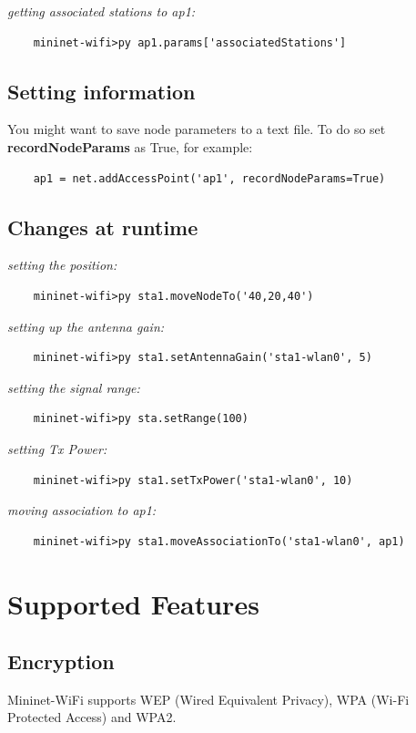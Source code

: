 \noindent \textit{getting associated stations to ap1:}
\begin{verbatim}
    mininet-wifi>py ap1.params['associatedStations']
\end{verbatim}

\subsection{Setting information}

You might want to save node parameters to a text file. To do so set \textbf{recordNodeParams} as True, for example:
\begin{verbatim}
    ap1 = net.addAccessPoint('ap1', recordNodeParams=True)
\end{verbatim}

\subsection{Changes at runtime}

\noindent \textit{setting the position:}
\begin{verbatim}
    mininet-wifi>py sta1.moveNodeTo('40,20,40')
\end{verbatim}

\noindent \textit{setting up the antenna gain:}
\begin{verbatim}
    mininet-wifi>py sta1.setAntennaGain('sta1-wlan0', 5)
\end{verbatim}

\noindent \textit{setting the signal range:}
\begin{verbatim}
    mininet-wifi>py sta.setRange(100)
\end{verbatim}

\noindent \textit{setting Tx Power:}
\begin{verbatim}
    mininet-wifi>py sta1.setTxPower('sta1-wlan0', 10)
\end{verbatim}

\noindent \textit{moving association to ap1:}
\begin{verbatim}
    mininet-wifi>py sta1.moveAssociationTo('sta1-wlan0', ap1)
\end{verbatim}

\section{Supported Features}

\subsection{Encryption}
Mininet-WiFi supports WEP (Wired Equivalent Privacy), WPA (Wi-Fi Protected Access) and WPA2.

